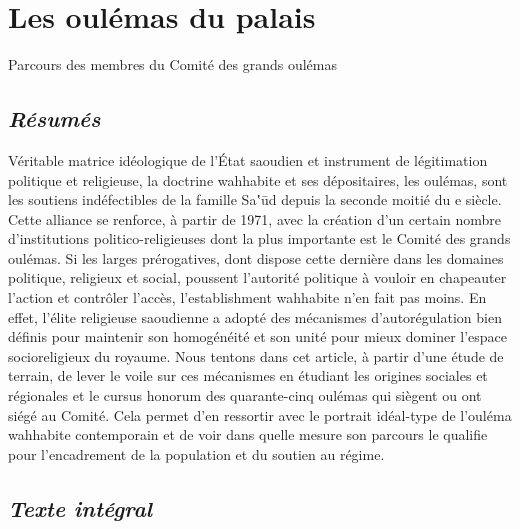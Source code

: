  

\section{Les oulémas du palais}

Parcours des membres du Comité des grands oulémas

\hypertarget{ruxe9sumuxe9s}{%
\subsection{\texorpdfstring{\emph{Résumés}}{Résumés}}\label{ruxe9sumuxe9s}}


Véritable matrice idéologique de l'État saoudien et instrument de
légitimation politique et religieuse, la doctrine wahhabite et ses
dépositaires, les oulémas, sont les soutiens indéfectibles de la famille
Sa‛ūd depuis la seconde moitié du e siècle. Cette alliance se renforce,
à partir de 1971, avec la création d'un certain nombre d'institutions
politico-religieuses dont la plus importante est le Comité des grands
oulémas. Si les larges prérogatives, dont dispose cette dernière dans
les domaines politique, religieux et social, poussent l'autorité
politique à vouloir en chapeauter l'action et contrôler l'accès,
l'establishment wahhabite n'en fait pas moins. En effet, l'élite
religieuse saoudienne a adopté des mécanismes d'autorégulation bien
définis pour maintenir son homogénéité et son unité pour mieux dominer
l'espace socioreligieux du royaume. Nous tentons dans cet article, à
partir d'une étude de terrain, de lever le voile sur ces mécanismes en
étudiant les origines sociales et régionales et le cursus honorum des
quarante-cinq oulémas qui siègent ou ont siégé au Comité. Cela permet
d'en ressortir avec le portrait idéal-type de l'ouléma wahhabite
contemporain et de voir dans quelle mesure son parcours le qualifie pour
l'encadrement de la population et du soutien au régime.

\hypertarget{texte-intuxe9gral}{%
\subsection{\texorpdfstring{\emph{Texte
intégral}}{Texte intégral}}\label{texte-intuxe9gral}}

